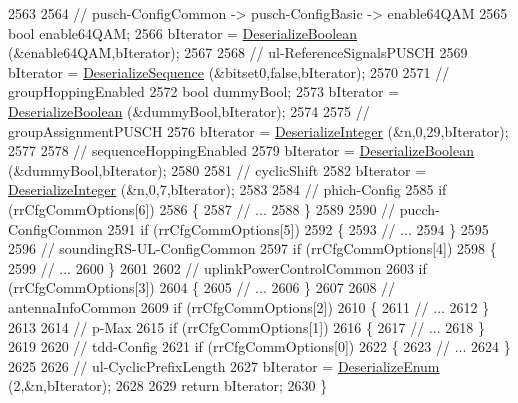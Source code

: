 \begin{DoxyCode}
2563 
2564   \textcolor{comment}{// pusch-ConfigCommon -> pusch-ConfigBasic -> enable64QAM}
2565   \textcolor{keywordtype}{bool} enable64QAM;
2566   bIterator = \hyperlink{classns3_1_1Asn1Header_ab46f4b86988a0fbeb5df11a9bc46222d}{DeserializeBoolean} (&enable64QAM,bIterator);
2567 
2568   \textcolor{comment}{// ul-ReferenceSignalsPUSCH}
2569   bIterator = \hyperlink{classns3_1_1Asn1Header_a58c68bb97ba3fe2e8fcdd7c208d672b2}{DeserializeSequence} (&bitset0,\textcolor{keyword}{false},bIterator);
2570 
2571   \textcolor{comment}{// groupHoppingEnabled}
2572   \textcolor{keywordtype}{bool} dummyBool;
2573   bIterator = \hyperlink{classns3_1_1Asn1Header_ab46f4b86988a0fbeb5df11a9bc46222d}{DeserializeBoolean} (&dummyBool,bIterator);
2574 
2575   \textcolor{comment}{// groupAssignmentPUSCH}
2576   bIterator = \hyperlink{classns3_1_1Asn1Header_a49802c9af30018b078150e866b6ecae2}{DeserializeInteger} (&n,0,29,bIterator);
2577 
2578   \textcolor{comment}{// sequenceHoppingEnabled}
2579   bIterator = \hyperlink{classns3_1_1Asn1Header_ab46f4b86988a0fbeb5df11a9bc46222d}{DeserializeBoolean} (&dummyBool,bIterator);
2580 
2581   \textcolor{comment}{// cyclicShift}
2582   bIterator = \hyperlink{classns3_1_1Asn1Header_a49802c9af30018b078150e866b6ecae2}{DeserializeInteger} (&n,0,7,bIterator);
2583 
2584   \textcolor{comment}{// phich-Config}
2585   \textcolor{keywordflow}{if} (rrCfgCommOptions[6])
2586     \{
2587       \textcolor{comment}{// ...}
2588     \}
2589 
2590   \textcolor{comment}{// pucch-ConfigCommon}
2591   \textcolor{keywordflow}{if} (rrCfgCommOptions[5])
2592     \{
2593       \textcolor{comment}{// ...}
2594     \}
2595 
2596   \textcolor{comment}{// soundingRS-UL-ConfigCommon}
2597   \textcolor{keywordflow}{if} (rrCfgCommOptions[4])
2598     \{
2599       \textcolor{comment}{// ...}
2600     \}
2601 
2602   \textcolor{comment}{// uplinkPowerControlCommon}
2603   \textcolor{keywordflow}{if} (rrCfgCommOptions[3])
2604     \{
2605       \textcolor{comment}{// ...}
2606     \}
2607 
2608   \textcolor{comment}{// antennaInfoCommon}
2609   \textcolor{keywordflow}{if} (rrCfgCommOptions[2])
2610     \{
2611       \textcolor{comment}{// ...}
2612     \}
2613 
2614   \textcolor{comment}{// p-Max}
2615   \textcolor{keywordflow}{if} (rrCfgCommOptions[1])
2616     \{
2617       \textcolor{comment}{// ...}
2618     \}
2619 
2620   \textcolor{comment}{// tdd-Config}
2621   \textcolor{keywordflow}{if} (rrCfgCommOptions[0])
2622     \{
2623       \textcolor{comment}{// ...}
2624     \}
2625 
2626   \textcolor{comment}{// ul-CyclicPrefixLength}
2627   bIterator = \hyperlink{classns3_1_1Asn1Header_a4fcc253e0eec3483c775b005c1875f2d}{DeserializeEnum} (2,&n,bIterator);
2628 
2629   \textcolor{keywordflow}{return} bIterator;
2630 \}
\end{DoxyCode}


